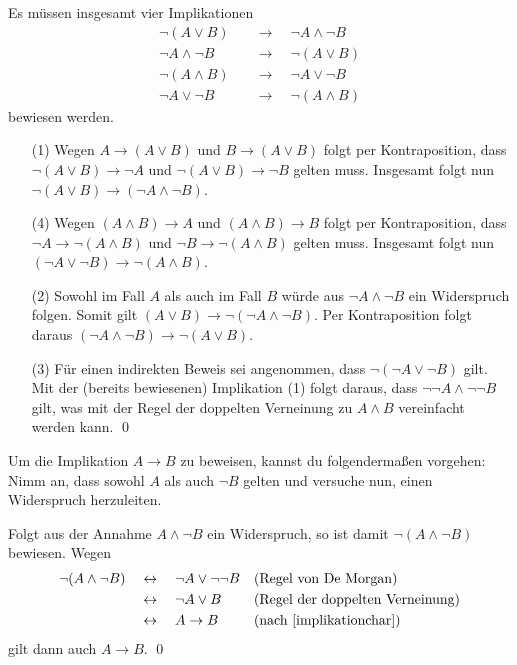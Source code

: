 \begin{bew}[(*)]
    Es müssen insgesamt vier Implikationen
    \begin{align}
    \neg (A\lor B) \quad& \to\quad \neg A\land \neg B \tag{1}\\
    \neg A\land \neg B\quad& \to\quad  \neg (A\lor B) \tag{2}\\
    \neg(A\land B) \quad& \to \quad \neg A\lor \neg B \tag{3}\\
    \neg A\lor \neg B \quad& \to \quad \neg(A\land B) \tag{4}
    \end{align}
    bewiesen werden.
    \begin{enumerate}
        \item[(1)] Wegen $A\to (A\lor B)$ und $B\to (A\lor B)$ folgt per Kontraposition, dass $\neg (A\lor B)\to \neg A$ und $\neg(A\lor B) \to \neg B$ gelten muss. Insgesamt folgt nun $\neg(A\lor B)\to( \neg A\land\neg B)$.
        \item[(4)] Wegen $(A\land B)\to A$ und $(A\land B) \to B$ folgt per Kontraposition, dass $\neg A\to \neg(A\land B)$ und $\neg B\to \neg(A\land B)$ gelten muss. Insgesamt folgt nun $(\neg A\lor \neg B)\to \neg(A\land B)$.
        \item[(2)] Sowohl im Fall $A$ als auch im Fall $B$ würde aus $\neg A\land \neg B$ ein Widerspruch folgen. Somit gilt $(A\lor B)\to \neg (\neg A\land \neg B)$. Per Kontraposition folgt daraus $(\neg A\land \neg B) \to \neg(A\lor B)$.
        \item[(3)] Für einen indirekten Beweis sei angenommen, dass $\neg (\neg A\lor\neg B)$ gilt. Mit der (bereits bewiesenen) Implikation (1) folgt daraus, dass $\neg\neg A\land\neg\neg B$ gilt, was mit der Regel der doppelten Verneinung zu $A\land B$ vereinfacht werden kann. \qed
    \end{enumerate}
\end{bew}

 
\begin{satz}
    Um die Implikation $A\to B$ zu beweisen, kannst du folgendermaßen vorgehen: Nimm an, dass sowohl $A$ als auch $\neg B$ gelten und versuche nun, einen Widerspruch herzuleiten.
\end{satz}


\begin{bew}
    Folgt aus der Annahme $A\land \neg B$ ein Widerspruch, so ist damit $\neg(A\land \neg B)$ bewiesen. Wegen
    \begin{align*}
        \neg (A\land \neg B) \quad&\leftrightarrow\quad \neg A\lor \neg\neg B && (\text{Regel von De Morgan}) \\
        &\leftrightarrow\quad \neg A\lor B && (\text{Regel der doppelten Verneinung}) \\
        & \leftrightarrow\quad A\to B && (\text{nach \cref{implikationchar}})
    \end{align*}
    gilt dann auch $A\to B$. \qed
\end{bew}

